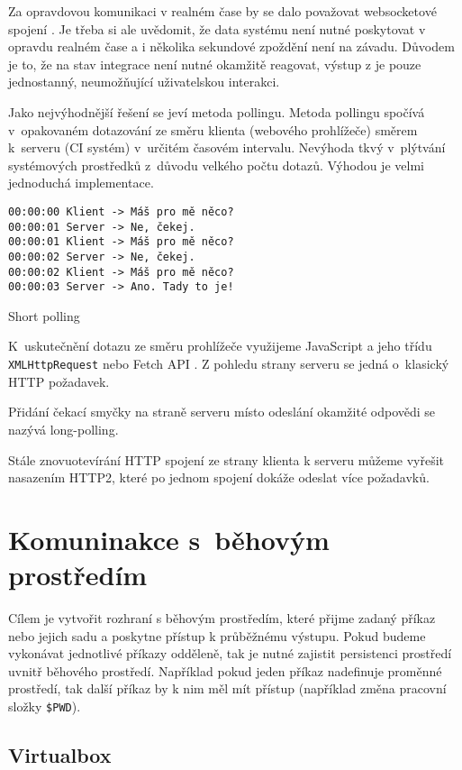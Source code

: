 Za opravdovou komunikaci v realném čase by se dalo považovat websocketové spojení \cite{websocket}.
Je třeba si ale uvědomit, že data systému není nutné poskytovat v opravdu realném čase a i několika sekundové zpoždění není na závadu.
Důvodem je to, že na stav integrace není nutné okamžitě reagovat, výstup z  je pouze jednostanný, neumožňující uživatelskou interakci.

Jako nejvýhodnější řešení se jeví metoda pollingu.
Metoda pollingu spočívá v~opakovaném dotazování ze směru klienta (webového prohlížeče) směrem k~serveru (CI systém) v~určitém časovém intervalu.
Nevýhoda tkvý v~plýtvání systémových prostředků z~důvodu velkého počtu dotazů.
Výhodou je velmi jednoduchá implementace.

\begin{listing}[ht]
\begin{verbatim}
00:00:00 Klient -> Máš pro mě něco?
00:00:01 Server -> Ne, čekej.
00:00:01 Klient -> Máš pro mě něco?
00:00:02 Server -> Ne, čekej.
00:00:02 Klient -> Máš pro mě něco?
00:00:03 Server -> Ano. Tady to je!
\end{verbatim}
\caption{Short polling}
\end{listing}

K~uskutečnění dotazu ze směru prohlížeče využijeme JavaScript a jeho třídu \verb|XMLHttpRequest| nebo Fetch API \cite{fetch_api}.
Z pohledu strany serveru se jedná o~klasický HTTP požadavek.

Přidání čekací smyčky na straně serveru místo odeslání okamžité odpovědi se nazývá long-polling.

Stále znovuotevírání HTTP spojení ze strany klienta k serveru můžeme vyřešit nasazením HTTP2, které po jednom spojení dokáže odeslat více požadavků.

\section{Komuninakce s~běhovým prostředím}

Cílem je vytvořit rozhraní s běhovým prostředím, které přijme zadaný příkaz nebo jejich sadu a poskytne přístup k průběžnému výstupu.
Pokud budeme vykonávat jednotlivé příkazy odděleně, tak je nutné zajistit persistenci prostředí uvnitř běhového prostředí.
Například pokud jeden příkaz nadefinuje proměnné prostředí, tak další příkaz by k nim měl mít přístup (například změna pracovní složky \verb|$PWD|).

\subsection{Virtualbox}

